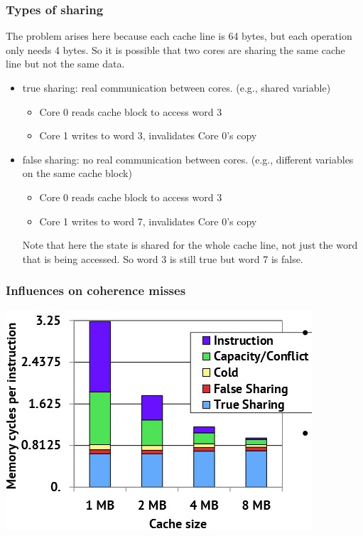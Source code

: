 \documentclass[letterpaper,12pt]{article}
\begin{document}
\subsubsection{Types of sharing}
The problem arises here because each cache line is 64 bytes, but each operation only needs 4 bytes. So it is possible that two cores are sharing the same cache line but not the same data.
\begin{itemize}
    \item true sharing: real communication between cores. (e.g., shared variable)\begin{itemize}
              \item Core 0 reads cache block to access word 3
              \item Core 1 writes to word 3, invalidates Core 0's copy
          \end{itemize}
    \item false sharing: no real communication between cores. (e.g., different variables on the same cache block)\begin{itemize}
              \item Core 0 reads cache block to access word 3
              \item Core 1 writes to word 7, invalidates Core 0's copy
          \end{itemize}
          Note that here the state is shared for the whole cache line, not just the word that is being accessed. So word 3 is still true but word 7 is false.
\end{itemize}
\subsubsection{Influences on coherence misses}
\includegraphics*[scale=0.7]{./Image/Coherence miss and cache size.jpg}
\end{document}
